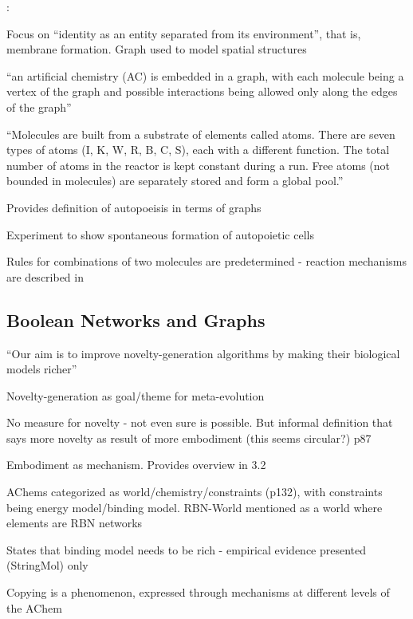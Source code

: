 \autocite{Fenizio2001}:
		

			
			Focus on ``identity as an entity separated from its environment'',
			that is, membrane formation. Graph used to model spatial structures
			

			``an artificial chemistry (AC) is embedded in a graph, with each
			molecule being a vertex of the graph and possible interactions being
			allowed only along the edges of the graph''

			``Molecules are built from a substrate of elements called atoms. There
			are seven types of atoms (I, K, W, R, B, C, S), each with a different
			function. The total number of atoms in the reactor is kept constant
			during a run. Free atoms (not bounded in molecules) are separately
			stored and form a global pool.''

			
			Provides definition of autopoeisis in terms of graphs
			

			Experiment to show spontaneous formation of autopoietic cells

			
			Rules for combinations of two molecules are predetermined - reaction
			mechanisms are described in \autocite{Fenizio2000}

\subsection{Boolean Networks and Graphs}

		
\autocite{Nellis2012}

			
			``Our aim is to improve novelty-generation algorithms by making their
			biological models richer''

			
			Novelty-generation as goal/theme for meta-evolution
			
			
			No measure for novelty - not even sure is possible. But informal
			definition that says more novelty as result of more embodiment (this
			seems circular?) p87

			
			Embodiment as mechanism. Provides overview in 3.2

			AChems categorized as world/chemistry/constraints (p132), with
			constraints being energy model/binding model. RBN-World mentioned as a
			world where elements are RBN networks

			
			States that binding model needs to be rich - empirical evidence
			presented (StringMol) only

			
			Copying is a phenomenon, expressed through mechanisms at different
			levels of the AChem

